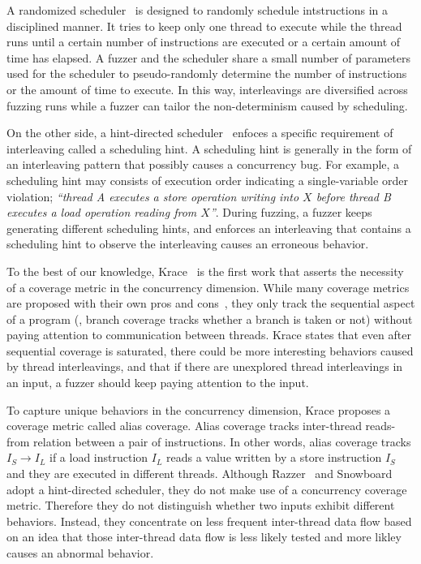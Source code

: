 A randomized scheduler~\cite{ski, pctalgorithm, krace, sparsernr} is
designed to randomly schedule intstructions in a disciplined
manner. It tries to keep only one thread to execute while the thread
runs until a certain number of instructions are executed or a certain
amount of time has elapsed.
%
A fuzzer and the scheduler share a small number of parameters used for
the scheduler to pseudo-randomly determine the number of instructions
or the amount of time to execute.
%
In this way, interleavings are diversified across fuzzing runs while a
fuzzer can tailor the non-determinism caused by scheduling.

On the other side, a hint-directed scheduler~\cite{razzer, snowboard}
enfoces a specific requirement of interleaving called a scheduling
hint.
%
A scheduling hint is generally in the form of an interleaving pattern
that possibly causes a concurrency bug. For example, a scheduling hint
may consists of execution order indicating a single-variable order
violation; \textit{``thread A executes a store operation writing into
  $X$ before thread B executes a load operation reading from $X$''}.
%
During fuzzing, a fuzzer keeps generating different scheduling hints,
and enforces an interleaving that contains a scheduling hint to
observe the interleaving causes an erroneous behavior.


%
To the best of our knowledge, Krace~\cite{krace} is the first work
that asserts the necessity of a coverage metric in the concurrency
dimension.
%
While many coverage metrics are proposed with their own pros and
cons~\cite{wang2019sensitive}, they only track the sequential aspect
of a program (\eg, branch coverage tracks whether a branch is taken or
not) without paying attention to communication between threads.
%
Krace states that even after sequential coverage is saturated, there
could be more interesting behaviors caused by thread interleavings,
and that if there are unexplored thread interleavings in an input, a
fuzzer should keep paying attention to the input.

To capture unique behaviors in the concurrency dimension, Krace
proposes a coverage metric called alias coverage.
%
Alias coverage tracks inter-thread reads-from relation between a pair
of instructions. In other words, alias coverage tracks
\texttt{$I_S \rightarrow I_L$} if a load instruction \texttt{$I_L$}
reads a value written by a store instruction \texttt{$I_S$} and they
are executed in different threads.
%
%
%
Although Razzer~\cite{razzer} and Snowboard~\cite{snowboard} adopt a
hint-directed scheduler, they do not make use of a concurrency
coverage metric. Therefore they do not distinguish whether two inputs
exhibit different behaviors. Instead, they concentrate on less
frequent inter-thread data flow based on an idea that those
inter-thread data flow is less likely tested and more likley causes an
abnormal behavior.

